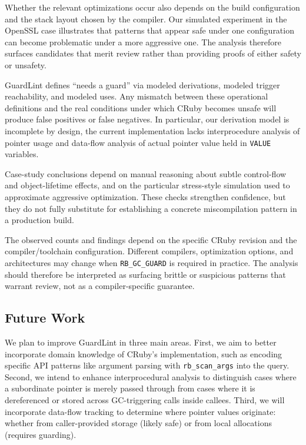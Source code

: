 Whether the relevant optimizations occur also depends on the build configuration and the stack layout chosen by the compiler. Our simulated experiment in the OpenSSL case illustrates that patterns that appear safe under one configuration can become problematic under a more aggressive one. The analysis therefore surfaces candidates that merit review rather than providing proofs of either safety or unsafety.

GuardLint defines ``needs a guard'' via modeled derivations, modeled trigger reachability, and modeled uses. Any mismatch between these operational definitions and the real conditions under which CRuby becomes unsafe will produce false positives or false negatives. In particular, our derivation model is incomplete by design, the current implementation lacks interprocedure analysis of pointer usage and data-flow analysis of actual pointer value held in \texttt{VALUE} variables.

Case-study conclusions depend on manual reasoning about subtle control-flow and object-lifetime effects, and on the particular stress-style simulation used to approximate aggressive optimization. These checks strengthen confidence, but they do not fully substitute for establishing a concrete miscompilation pattern in a production build.

The observed counts and findings depend on the specific CRuby revision and the compiler/toolchain configuration. Different compilers, optimization options, and architectures may change when \texttt{RB\_GC\_GUARD} is required in practice. The analysis should therefore be interpreted as surfacing brittle or suspicious patterns that warrant review, not as a compiler-specific guarantee.

\subsection{Future Work}
We plan to improve GuardLint in three main areas. First, we aim to better incorporate domain knowledge of CRuby's implementation, such as encoding specific API patterns like argument parsing with \texttt{rb\_scan\_args} into the query. Second, we intend to enhance interprocedural analysis to distinguish cases where a subordinate pointer is merely passed through from cases where it is dereferenced or stored across GC-triggering calls inside callees. Third, we will incorporate data-flow tracking to determine where pointer values originate: whether from caller-provided storage (likely safe) or from local allocations (requires guarding).

